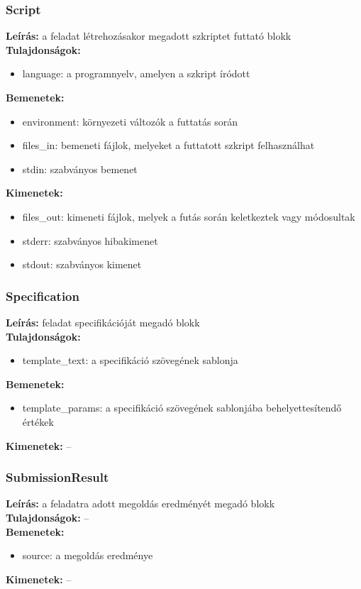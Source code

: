 \subsubsection{Script}
\textbf{Leírás:} a feladat létrehozásakor megadott szkriptet futtató blokk \\
\textbf{Tulajdonságok:}
\begin{itemize}
    \item language: a programnyelv, amelyen a szkript íródott
\end{itemize}
\textbf{Bemenetek:}
\begin{itemize}
    \item environment: környezeti változók a futtatás során
    \item files\_in: bemeneti fájlok, melyeket a futtatott szkript felhasználhat
    \item stdin: szabványos bemenet
\end{itemize}
\textbf{Kimenetek:}
\begin{itemize}
    \item files\_out: kimeneti fájlok, melyek a futás során keletkeztek vagy módosultak
    \item stderr: szabványos hibakimenet
    \item stdout: szabványos kimenet
\end{itemize}

\subsubsection{Specification}
\textbf{Leírás:} feladat specifikációját megadó blokk \\
\textbf{Tulajdonságok:}
\begin{itemize}
    \item template\_text: a specifikáció szövegének sablonja
\end{itemize}
\textbf{Bemenetek:}
\begin{itemize}
    \item template\_params: a specifikáció szövegének sablonjába behelyettesítendő értékek
\end{itemize}
\textbf{Kimenetek:} --

\subsubsection{SubmissionResult}
\textbf{Leírás:} a feladatra adott megoldás eredményét megadó blokk \\
\textbf{Tulajdonságok:} -- \\
\textbf{Bemenetek:}
\begin{itemize}
    \item source: a megoldás eredménye
\end{itemize}
\textbf{Kimenetek:} --

